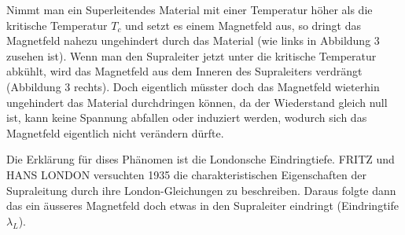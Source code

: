 Nimmt man ein Superleitendes Material mit einer Temperatur höher als die kritische Temperatur $T_c$
und setzt es einem Magnetfeld aus, so dringt das Magnetfeld nahezu ungehindert durch das Material (wie links in Abbildung 3 zusehen ist). 
Wenn man den Supraleiter jetzt unter die kritische Temperatur abkühlt, wird das Magnetfeld aus dem Inneren des Supraleiters verdrängt (Abbildung 3 rechts).
Doch eigentlich müsster doch das Magnetfeld wieterhin ungehindert das Material durchdringen können, da der 
Wiederstand gleich null ist, kann keine Spannung abfallen oder induziert werden, wodurch sich das Magnetfeld 
eigentlich nicht verändern dürfte.

Die Erklärung für dises Phänomen ist die Londonsche Eindringtiefe. FRITZ und HANS LONDON
versuchten 1935 die charakteristischen Eigenschaften der Supraleitung durch ihre London-Gleichungen 
zu beschreiben. Daraus folgte dann das ein äusseres Magnetfeld doch etwas in den Supraleiter eindringt (Eindringtife $\lambda_L$).

